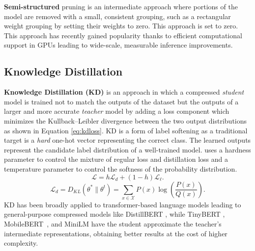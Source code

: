 \textbf{Semi-structured} pruning is an intermediate approach where portions of the model are removed with a small, consistent grouping, such as a rectangular weight grouping \cite{lagunas21block} by setting their weights to zero. This approach is set to zero. This approach has recently gained popularity thanks to efficient computational support in GPUs leading to wide-scale, measurable inference improvements.
\subsection{Knowledge Distillation}
\textbf{Knowledge Distillation (KD)} \cite{Hinton2015DistillingTK} is an approach in which a compressed \textit{student} model is trained not to match the outputs of the dataset but the outputs of a larger and more accurate \textit{teacher} model by adding a loss component which minimizes the Kullback–Leibler divergence between the two output distributions as shown in Equation \ref{eq:kdloss}. KD is a form of label softening as a traditional target is a \textit{hard} one-hot vector representing the correct class. The learned outputs represent the candidate label distribution of a well-trained model.
uses a hardness parameter to control the mixture of regular loss and distillation loss and a temperature parameter to control the softness of the probability distribution.\\
\begin{equation}
    \mathcal{L}= h \mathcal{L}_d + (1-h) \mathcal{L}_{\ell}. 
\label{eq:kdloss}
\end{equation}
 \begin{equation}
     \mathcal{L}_d= {\displaystyle D_{\textit{KL}}(\theta^* \parallel \theta^\textit{t})=\sum _{x\in {\mathcal {X}}}P(x)\log \left({\frac {P(x)}{Q(x)}}\right).}
 \label{eq:kl}
 \end{equation}
KD has been broadly applied to transformer-based language models leading to general-purpose compressed models like DistillBERT \cite{Sanh2019DistilBERTAD}, while TinyBERT \cite{Jiao2020TinyBERTDB}, MobileBERT~\cite{Sun2020MobileBERTAC}, and MiniLM \cite{Wang2020MiniLMDS} have the student approximate the teacher's intermediate representations, obtaining better results at the cost of higher complexity. 
